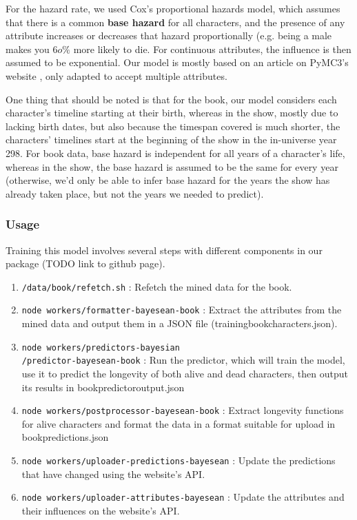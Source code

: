 \documentclass{bioinfo}
\begin{document}
For the hazard rate, we used Cox's proportional hazards model, which assumes that there is a common \textbf{base hazard} for all characters, and the presence of any attribute increases or decreases that hazard proportionally (e.g. being a male makes you $6o\%$ more likely to die. For continuous attributes, the influence is then assumed to be exponential. Our model is mostly based on an article on PyMC3's website \cite{bayesian-surv}, only adapted to accept multiple attributes.

One thing that should be noted is that for the book, our model considers each character's timeline starting at their birth, whereas in the show, mostly due to lacking birth dates, but also because the timespan covered is much shorter, the characters' timelines start at the beginning of the show in the in-universe year 298. For book data, base hazard is independent for all years of a character's life, whereas in the show, the base hazard is assumed to be the same for every year (otherwise, we'd only be able to infer base hazard for the years the show has already taken place, but not the years we needed to predict).

\subsubsection{Usage}
Training this model involves several steps with different components in our package (TODO link to github page).

\begin{enumerate}
    \item \texttt{/data/book/refetch.sh} : Refetch the mined data for the book.
    \item \texttt{node workers/formatter-bayesean-book} : Extract the attributes from the mined data and output them in a JSON file (training{\textunderscore}book{\textunderscore}characters.json).
    \item \texttt{node workers/predictors-bayesian\\/predictor-bayesean-book} : Run the predictor, which will train the model, use it to predict the longevity of both alive and dead characters, then output its results in book{\textunderscore}predictor{\textunderscore}output.json
    \item \texttt{node workers/postprocessor-bayesean-book} : Extract longevity functions for alive characters and format the data in a format suitable for upload in book{\textunderscore}predictions.json
    \item \texttt{node workers/uploader-predictions-bayesean} : Update the predictions that have changed using the website's API.
    \item \texttt{node workers/uploader-attributes-bayesean} : Update the attributes and their influences on the website's API.
\end{enumerate}
\end{document}
